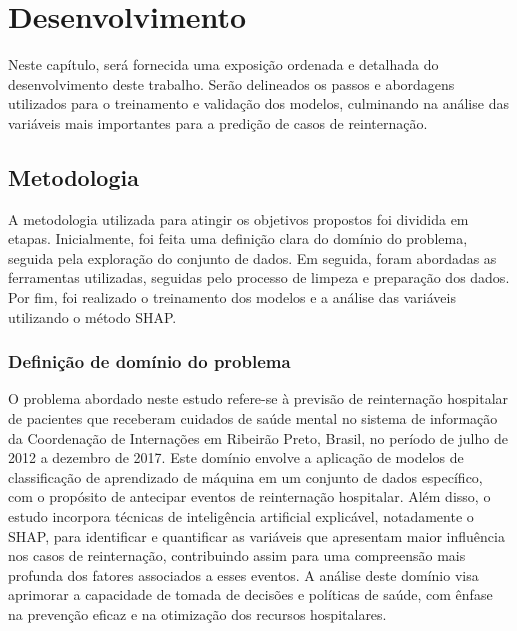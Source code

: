 

\chapter{Desenvolvimento}\label{cap-desenv}

Neste capítulo, será fornecida uma exposição ordenada e detalhada do desenvolvimento deste trabalho. Serão delineados os passos e abordagens utilizados para o treinamento e validação dos modelos, culminando na análise das variáveis mais importantes para a predição de casos de reinternação.

\section{Metodologia}\label{sec-metodologia}

A metodologia utilizada para atingir os objetivos propostos foi dividida em etapas. Inicialmente, foi feita uma definição clara do domínio do problema, seguida pela exploração do conjunto de dados. Em seguida, foram abordadas as ferramentas utilizadas, seguidas pelo processo de limpeza e preparação dos dados. Por fim, foi realizado o treinamento dos modelos e a análise das variáveis utilizando o método SHAP.

\subsection{Definiç\~ao de domínio do problema}

O problema abordado neste estudo refere-se à previsão de reinternação hospitalar de pacientes que receberam cuidados de saúde mental no sistema de informação da Coordenação de Internações em Ribeirão Preto, Brasil, no período de julho de 2012 a dezembro de 2017. Este domínio envolve a aplicação de modelos de classificação de aprendizado de máquina em um conjunto de dados específico, com o propósito de antecipar eventos de reinternação hospitalar. Além disso, o estudo incorpora técnicas de inteligência artificial explicável, notadamente o SHAP, para identificar e quantificar as variáveis que apresentam maior influência nos casos de reinternação, contribuindo assim para uma compreensão mais profunda dos fatores associados a esses eventos. A análise deste domínio visa aprimorar a capacidade de tomada de decisões e políticas de saúde, com ênfase na prevenção eficaz e na otimização dos recursos hospitalares.


